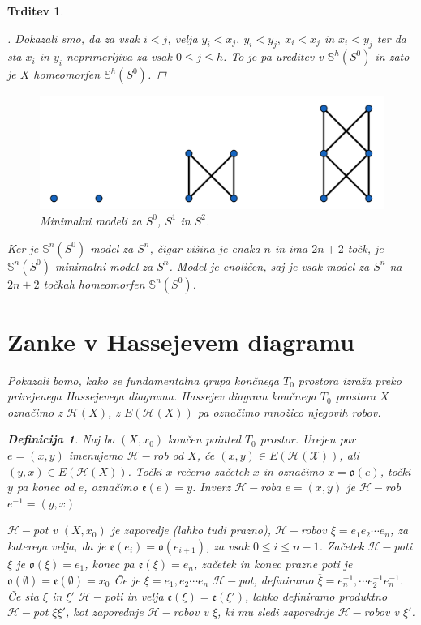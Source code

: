 \documentclass[a4paper,12pt]{article}
\DeclareRobustCommand{\h}{
    \mathcal{H}
}
\DeclareRobustCommand{\pot}{
    $\h-$pot
}
\theoremstyle{definition}
\newtheorem{definicija}{Definicija}
\theoremstyle{plain}
\theoremstyle{definition}
\theoremstyle{plain}
\newtheorem{trditev}{Trditev}
\theoremstyle{plain}
\theoremstyle{plain}
\theoremstyle{plain}
\newenvironment{dokaz}{\begin{proof}[\bfseries\upshape\proofname]}{\end{proof}}
\begin{document}
\begin{trditev}
\begin{dokaz}
        Dokazali smo, da za vsak $i<j$,  velja $y_i < x_j,\ y_i < y_j,\ x_i < x_j$ in
        $x_i < y_j$ ter da sta $x_i$ in $y_i$ neprimerljiva za vsak $0\leq j \leq h$.
        To je pa ureditev v $\mathds{S}^h(S^0)$ in zato je $X$ homeomorfen 
        $\mathds{S}^h(S^0)$.

\end{dokaz}

\begin{figure}[h]
    \centering
    \includegraphics[width=0.8\linewidth]{sfere.png}
    \caption{Minimalni modeli za $S^0$, $S^1$ in $S^2$.}
\end{figure}

Ker je $\mathds{S}^n(S^0)$ model za $S^n$, čigar višina je enaka $n$ in ima 
$2n+2$ točk, je $\mathds{S}^n(S^0)$ minimalni model za $S^n$. Model je 
enoličen, saj je vsak model za $S^n$ na $2n+2$ točkah homeomorfen 
$\mathds{S}^n(S^0)$.
\section{Zanke v Hassejevem diagramu}

Pokazali bomo, kako se fundamentalna grupa končnega $T_0$ 
prostora izraža preko prirejenega Hassejevega diagrama.
Hassejev diagram končnega $T_0$ prostora $X$ označimo z 
$\h(X)$, z $E(\h(X))$ pa označimo množico njegovih robov.


\begin{definicija}
    Naj bo $(X,x_0)$ končen pointed $T_0$ prostor. Urejen par 
$e=(x,y)$ imenujemo $\mathcal{H}-$rob od $X$, če $(x,y)\in 
E(\mathcal{H}(\mathcal{X}))$, ali $(y,x)\in 
E(\h(X))$. Točki $x$ rečemo \textit{začetek} $x$ in označimo 
$x=\mathfrak{o}(e)$, točki $y$ pa \textit{konec} od $e$, 
označimo $\mathfrak{e}(e)=y$. \textit{Inverz} $\h-$roba $e=(x,y)$ je $\h-$rob $e^{-1}=(y,x)$

$\h-$pot v $(X,x_0)$ je zaporedje (lahko tudi prazno), $\h-$robov $\xi=e_1e_2\cdots e_n$, 
za katerega velja, da je $\mathfrak{e}(e_i)=\mathfrak{o}(e_{i+1})$, za vsak $0\leq i \leq n-1$.
 Začetek $\h-$poti $\xi$ je  $\mathfrak{o}(\xi)=e_1$, konec pa $\mathfrak{e}(\xi)=e_n$, 
 začetek in konec prazne poti je $\mathfrak{o}(\emptyset)=\mathfrak{e}(\emptyset)=x_0$
 Če je $\xi=e_1,e_2\cdots e_n$ $\h-$pot, definiramo $\overline{\xi}=e_n^{-1},\cdots 
 e_2^{-1}e_n^{-1}$. Če sta $\xi$ in $\xi'$ $\h-$poti in velja $\mathfrak{e}(\xi)=
 \mathfrak{e}(\xi')$, lahko definiramo produktno \pot $\xi\xi'$, kot zaporednje 
 $\h-$robov v $\xi$, ki mu sledi zaporednje $\h-$robov v $\xi'$.


\end{definicija}
\end{trditev}
\end{document}
